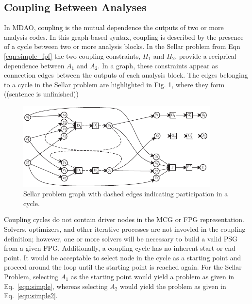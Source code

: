 \subsection{Coupling Between Analyses}
In MDAO, coupling is the mutual dependence the outputs of two or more analysis codes. In this graph-based syntax, coupling is described by the presence of a cycle between two or more analysis blocks. 
In the Sellar problem from Eqn \ref{eqn:simple_fpf} the two 
  coupling constraints, $H_1$ and $H_2$, provide a reciprical dependence between 
  $A_1$ and $A_2$. In a graph, these constraints appear as connection edges between 
  the outputs of each analysis block. The edges belonging to a cycle in the Sellar problem are highlighted in 
  Fig. \ref{f:sellar cycles}, where they form ((sentence is unfinished))

 \begin{figure}[htb!]
  \begin{center}
    \includegraphics[width=4.0in]{images/sellar_cycles}
  \end{center}
  \caption{Sellar problem graph with dashed edges indicating participation in a cycle.}
\label{f:sellar cycles}
\end{figure} 

  Coupling cycles do not contain driver nodes in the MCG or FPG representation. 
  Solvers, optimizers, and other iterative processes are not invovled in the coupling 
  definition; however, one or more solvers will be necessary to build a valid PSG from a given FPG. 
  Additionally, a coupling cycle has no inherent start or end point. It would be acceptable to select
  node in the cycle as a starting point and proceed around the
  loop until the starting point is reached again. For the Sellar Problem, selecting 
  $A_1$ as the starting point would yield a problem as given in 
  Eq.~\ref{eqn:simple}, whereas selecting $A_2$ would yield the problem as given in 
  Eq.~\ref{eqn:simple2}.

